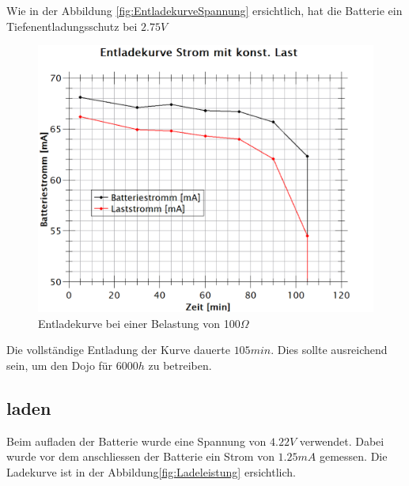 Wie in der Abbildung \ref{fig:EntladekurveSpannung} ersichtlich, hat die Batterie ein Tiefenentladungsschutz bei $2.75V$

\begin{figure}[htb]
	\centering
	\includegraphics[width=\textwidth]{graphics/EnladekurveStrom.png}
	\caption{Entladekurve bei einer Belastung von 100$\Omega$}
	\label{fig:EntladekurveStrom}
\end{figure}



Die vollständige Entladung der Kurve dauerte $105min$. Dies sollte ausreichend sein, um den Dojo für $6000h$ zu betreiben.





\newpage

\subsection*{laden}
Beim aufladen der Batterie wurde eine Spannung von $4.22V$ verwendet. Dabei wurde vor dem anschliessen der Batterie ein Strom von $1.25mA$ gemessen. Die Ladekurve ist in der Abbildung\ref{fig:Ladeleistung} ersichtlich.

